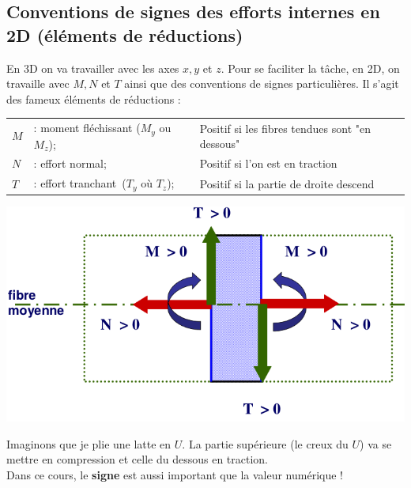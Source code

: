 	\subsection{Conventions de signes des efforts internes en 2D 
	(éléments de réductions)}
	En 3D on va travailler avec les axes $x,y$ et $z$. Pour se 
	faciliter la tâche, en 2D, on travaille avec $M,N$ et $T$ ainsi 
	que des conventions de signes particulières. Il s'agit des 
	fameux éléments de réductions :\\
	\begin{tabular}{lll}
	$M$ &: moment fléchissant ($M_y$ ou $M_z$); & Positif si les fibres 
	tendues sont "en dessous"\\
	$N$ &: effort normal; & Positif si l'on est en traction\\
	$T$ &: effort tranchant\footnotemark\ 
	($T_y$ où $T_z$); & Positif si la partie de droite descend
	\end{tabular}
	\begin{center}
	\includegraphics[scale=0.45]{ch2/image7}
	\end{center}

	Imaginons que  je plie une latte en $U$. La partie supérieure (le 
	creux du $U$) va se mettre en compression et celle du dessous en 
	traction.\\
	\danger Dans ce cours, le \textbf{signe} est aussi important que la 
	valeur numérique !
	

